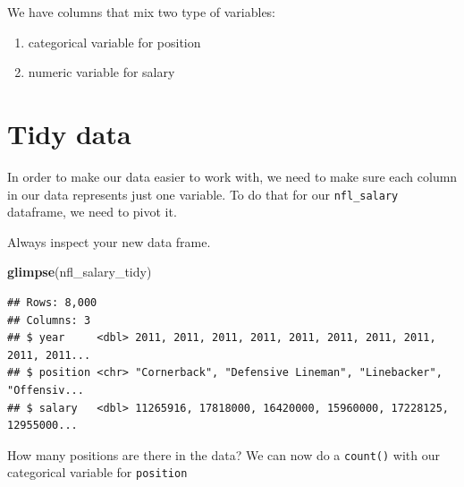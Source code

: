 \documentclass[
]{book}
\newenvironment{Shaded}{\begin{snugshade}}{\end{snugshade}}
\newcommand{\DataTypeTok}[1]{\textcolor[rgb]{0.13,0.29,0.53}{#1}}
\newcommand{\KeywordTok}[1]{\textcolor[rgb]{0.13,0.29,0.53}{\textbf{#1}}}
\newcommand{\NormalTok}[1]{#1}
\newcommand{\OperatorTok}[1]{\textcolor[rgb]{0.81,0.36,0.00}{\textbf{#1}}}
\newcommand{\StringTok}[1]{\textcolor[rgb]{0.31,0.60,0.02}{#1}}
\begin{document}
We have columns that mix two type of variables:

\begin{enumerate}
\def\labelenumi{\alph{enumi})}
\item
  categorical variable for position
\item
  numeric variable for salary
\end{enumerate}

\hypertarget{tidy-data}{%
\section{Tidy data}\label{tidy-data}}

In order to make our data easier to work with, we need to make sure each column in our data represents just one variable. To do that for our \texttt{nfl\_salary} dataframe, we need to pivot it.

\begin{Shaded}
\end{Shaded}

Always inspect your new data frame.

\begin{Shaded}
\begin{Highlighting}[]
\KeywordTok{glimpse}\NormalTok{(nfl_salary_tidy)}
\end{Highlighting}
\end{Shaded}

\begin{verbatim}
## Rows: 8,000
## Columns: 3
## $ year     <dbl> 2011, 2011, 2011, 2011, 2011, 2011, 2011, 2011, 2011, 2011...
## $ position <chr> "Cornerback", "Defensive Lineman", "Linebacker", "Offensiv...
## $ salary   <dbl> 11265916, 17818000, 16420000, 15960000, 17228125, 12955000...
\end{verbatim}

How many positions are there in the data? We can now do a \texttt{count()} with our categorical variable for \texttt{position}

\begin{Shaded}
\end{Shaded}
\end{document}

